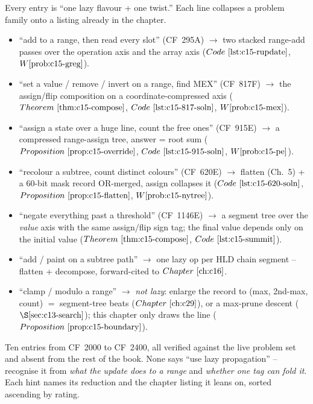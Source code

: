 
Every entry is ``one lazy flavour + one twist.'' Each line collapses a problem family
onto a listing already in the chapter.

\begin{itemize}[nosep, leftmargin=1.4em]
  \item ``add to a range, then read every slot'' (CF~295A) \(\to\) two stacked
        range-add passes over the operation axis and the array axis
        (\(\coderef{c15-rupdate}\), \(\probref{c15-greg}\)).
  \item ``set a value / remove / invert on a range, find MEX'' (CF~817F) \(\to\) the
        assign/flip composition on a coordinate-compressed axis
        (\(\thmref{c15-compose}\), \(\coderef{c15-817-soln}\), \(\probref{c15-mex}\)).
  \item ``assign a state over a huge line, count the free ones'' (CF~915E) \(\to\) a
        compressed range-assign tree, answer = root sum (\(\propref{c15-override}\),
        \(\coderef{c15-915-soln}\), \(\probref{c15-pe}\)).
  \item ``recolour a subtree, count distinct colours'' (CF~620E) \(\to\) flatten (Ch.~5)
        + a 60-bit mask record OR-merged, assign collapses it (\(\coderef{c15-620-soln}\),
        \(\propref{c15-flatten}\), \(\probref{c15-nytree}\)).
  \item ``negate everything past a threshold'' (CF~1146E) \(\to\) a segment tree over the
        \emph{value} axis with the same assign/flip sign tag; the final value depends only
        on the initial value (\(\thmref{c15-compose}\), \(\coderef{c15-summit}\)).
  \item ``add / paint on a subtree path'' \(\to\) one lazy op per HLD chain segment --
        flatten + decompose, forward-cited to \(\chref{c16}\).
  \item ``clamp / modulo a range'' \(\to\) \emph{not lazy}: enlarge the record to
        (max, 2nd-max, count) \(=\) segment-tree beats (\(\chref{c29}\)), or a
        max-prune descent (\(\secref{c13-search}\)); this chapter only draws the
        line (\(\propref{c15-boundary}\)).
\end{itemize}


Ten entries from CF~2000 to CF~2400, all verified against the live problem set and
absent from the rest of the book. None says ``use lazy propagation'' -- recognise it from
\emph{what the update does to a range} and \emph{whether one tag can fold it}. Each hint
names its reduction and the chapter listing it leans on, sorted ascending by rating.

